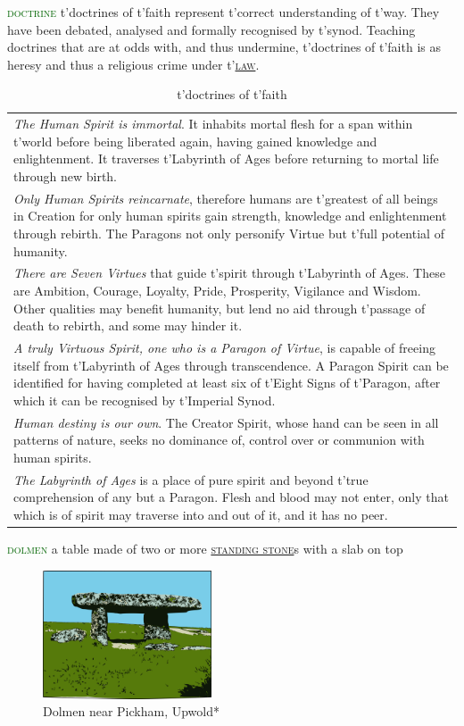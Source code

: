 \documentclass[twoside,11pt,b5paper,twocolumn]{scrbook}
\newcommand{\estcab}[1]{\textsc{\textcolor{marron}{#1}}}
\newcommand{\keyword}[1]{\textcolor{darkgreen}{#1}}
\renewcommand{\paragraph}[1]{\par\noindent\markboth{#1}{#1}\estcab{\keyword{#1}}\label{#1} }
\newcommand{\see}[1]{{\estcab{\hyperref[#1]{#1}}}}
\begin{document}
\paragraph{doctrine} t'doctrines of t'faith represent t'correct understanding of t'way. They have been debated, analysed and formally recognised by t'synod. Teaching doctrines that are at odds with, and thus undermine, t'doctrines of t'faith is as heresy and thus a religious crime under t'\see{law}.\begin{table} \begin{tabular}{p{}}\emph{The Human Spirit is immortal}. It inhabits mortal flesh for a span within t'world before being liberated again, having gained knowledge and enlightenment. It traverses t'Labyrinth of Ages before returning to mortal life through new birth.\\ \emph{Only Human Spirits reincarnate}, therefore humans are t'greatest of all beings in Creation for only human spirits gain strength, knowledge and enlightenment through rebirth. The Paragons not only personify Virtue but t'full potential of humanity.\\\emph{There are Seven Virtues} that guide t'spirit through t'Labyrinth of Ages. These are Ambition, Courage, Loyalty, Pride, Prosperity, Vigilance and Wisdom. Other qualities may benefit humanity, but lend no aid through t'passage of death to rebirth, and some may hinder it.\\\emph{A truly Virtuous Spirit, one who is a Paragon of Virtue}, is capable of freeing itself from t'Labyrinth of Ages through transcendence. A Paragon Spirit can be identified for having completed at least six of t'Eight Signs of t'Paragon, after which it can be recognised by t'Imperial Synod.\\\emph{Human destiny is our own}. The Creator Spirit, whose hand can be seen in all patterns of nature, seeks no dominance of, control over or communion with human spirits.\\\emph{The Labyrinth of Ages} is a place of pure spirit and beyond t'true comprehension of any but a Paragon. Flesh and blood may not enter, only that which is of spirit may traverse into and out of it, and it has no peer.\end{tabular}\caption{t'doctrines of t'faith}\end{table}
\paragraph{dolmen} a table made of two or more \see{standing stone}s with a slab on top \begin{figure}\centering\includegraphics[width=5cm]{encyclopedia/dolmen}\caption[Dolmen*]{Dolmen near Pickham, Upwold*}\end{figure}
\end{document}
